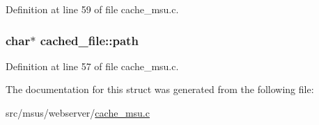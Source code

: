Definition at line 59 of file cache\-\_\-msu.\-c.

\hypertarget{structcached__file_ad365c05408e61278455735c5a3725238}{
\subsubsection[{path}]{\setlength{\rightskip}{0pt plus 5cm}char$\ast$ cached\-\_\-file\-::path}}\label{structcached__file_ad365c05408e61278455735c5a3725238}


Definition at line 57 of file cache\-\_\-msu.\-c.



The documentation for this struct was generated from the following file\-:\begin{DoxyCompactItemize}
\item 
src/msus/webserver/\hyperlink{cache__msu_8c}{cache\-\_\-msu.\-c}\end{DoxyCompactItemize}
